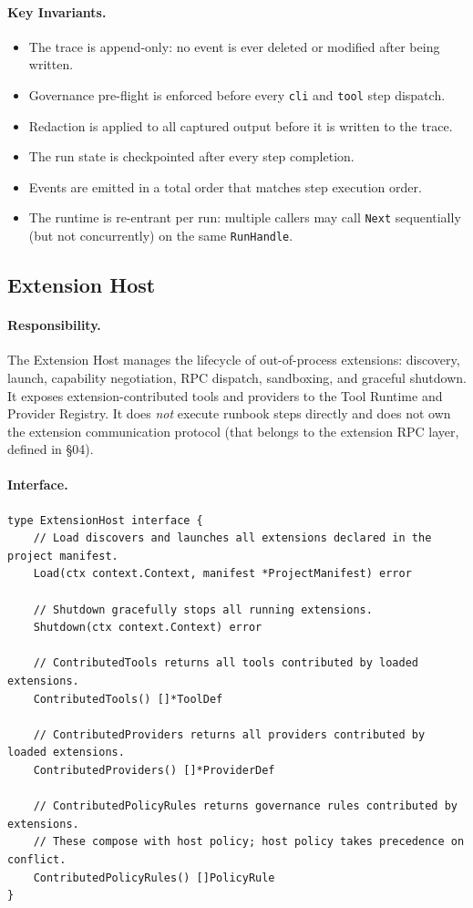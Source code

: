 \paragraph{Key Invariants.}
\begin{itemize}
  \item The trace is append-only: no event is ever deleted or modified after being written.
  \item Governance pre-flight is enforced before every \texttt{cli} and \texttt{tool} step dispatch.
  \item Redaction is applied to all captured output before it is written to the trace.
  \item The run state is checkpointed after every step completion.
  \item Events are emitted in a total order that matches step execution order.
  \item The runtime is re-entrant per run: multiple callers may call \texttt{Next} sequentially
        (but not concurrently) on the same \texttt{RunHandle}.
\end{itemize}

\subsection{Extension Host}

\paragraph{Responsibility.}
The Extension Host manages the lifecycle of out-of-process extensions: discovery, launch, capability
negotiation, RPC dispatch, sandboxing, and graceful shutdown. It exposes extension-contributed tools
and providers to the Tool Runtime and Provider Registry. It does \emph{not} execute runbook steps
directly and does not own the extension communication protocol (that belongs to the extension RPC
layer, defined in §04).

\paragraph{Interface.}

\begin{verbatim}
type ExtensionHost interface {
    // Load discovers and launches all extensions declared in the project manifest.
    Load(ctx context.Context, manifest *ProjectManifest) error

    // Shutdown gracefully stops all running extensions.
    Shutdown(ctx context.Context) error

    // ContributedTools returns all tools contributed by loaded extensions.
    ContributedTools() []*ToolDef

    // ContributedProviders returns all providers contributed by loaded extensions.
    ContributedProviders() []*ProviderDef

    // ContributedPolicyRules returns governance rules contributed by extensions.
    // These compose with host policy; host policy takes precedence on conflict.
    ContributedPolicyRules() []PolicyRule
}
\end{verbatim}

